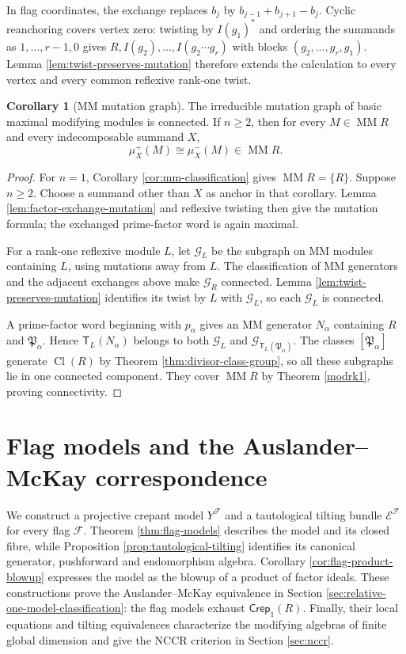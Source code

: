 \documentclass[a4paper,reqno]{amsart}
\def\E{\mathcal{E}}
\def\F{\mathcal{F}}
\DeclareMathOperator{\Cl}{Cl}
\DeclareMathOperator{\MM}{MM}
\theoremstyle{definition}
\newtheorem{Cor}[Thm]{Corollary}
\begin{document}
In flag coordinates, the exchange replaces $b_j$ by $b_{j-1}+b_{j+1}-b_j$. Cyclic reanchoring covers vertex zero: twisting by $I(g_1)^*$ and ordering the summands as $1,\ldots,r-1,0$ gives $R,I(g_2),\ldots,I(g_2\cdots g_r)$ with blocks $(g_2,\ldots,g_r,g_1)$. Lemma \ref{lem:twist-preserves-mutation} therefore extends the calculation to every vertex and every common reflexive rank-one twist.


\begin{Cor}[MM mutation graph]\label{cor:mm-mutation-connectivity}
The irreducible mutation graph of basic maximal modifying modules is connected. If $n\ge2$, then for every $M\in\MM R$ and every indecomposable summand $X$,
\[
\mu_X^+(M)\cong\mu_X^-(M)\in\MM R.
\]
\end{Cor}
\begin{proof}
For $n=1$, Corollary \ref{cor:mm-classification} gives $\MM R=\{R\}$. Suppose $n\ge2$. Choose a summand other than $X$ as anchor in that corollary. Lemma \ref{lem:factor-exchange-mutation} and reflexive twisting then give the mutation formula; the exchanged prime-factor word is again maximal.

For a rank-one reflexive module $L$, let $\mathcal G_L$ be the subgraph on MM modules containing $L$, using mutations away from $L$. The classification of MM generators and the adjacent exchanges above make $\mathcal G_R$ connected. Lemma \ref{lem:twist-preserves-mutation} identifies its twist by $L$ with $\mathcal G_L$, so each $\mathcal G_L$ is connected.

A prime-factor word beginning with $p_\alpha$ gives an MM generator $N_\alpha$ containing $R$ and $\mathfrak P_\alpha$. Hence $\mathsf T_L(N_\alpha)$ belongs to both $\mathcal G_L$ and $\mathcal G_{\mathsf T_L(\mathfrak P_\alpha)}$. The classes $[\mathfrak P_\alpha]$ generate $\Cl(R)$ by Theorem \ref{thm:divisor-class-group}, so all these subgraphs lie in one connected component. They cover $\MM R$ by Theorem \ref{modrk1}, proving connectivity.
\end{proof}

\section{Flag models and the Auslander--McKay correspondence}\label{sec:flag-models}

We construct a projective crepant model $Y^\F$ and a tautological tilting bundle $\E^\F$ for every flag $\F$. Theorem \ref{thm:flag-models} describes the model and its closed fibre, while Proposition \ref{prop:tautological-tilting} identifies its canonical generator, pushforward and endomorphism algebra. Corollary \ref{cor:flag-product-blowup} expresses the model as the blowup of a product of factor ideals. These constructions prove the Auslander--McKay equivalence in Section \ref{sec:relative-one-model-classification}: the flag models exhaust $\mathsf{Crep}_1(R)$. Finally, their local equations and tilting equivalences characterize the modifying algebras of finite global dimension and give the NCCR criterion in Section \ref{sec:nccr}.
\end{document}
